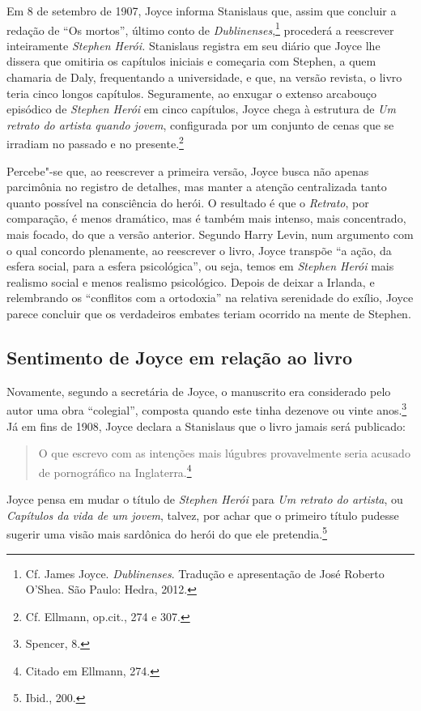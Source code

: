 Em 8 de setembro de 1907, Joyce informa Stanislaus que, assim que
concluir a redação de “Os mortos”, último conto de \textit{Dublinenses},\footnote{ Cf. James Joyce. 
\textit{Dublinenses}. Tradução e apresentação de José Roberto O'Shea. São Paulo: Hedra, 2012.} 
procederá a reescrever inteiramente
\textit{Stephen Herói.}  Stanislaus registra em seu diário que Joyce
lhe dissera que omitiria os capítulos iniciais e começaria com Stephen,
a quem chamaria de Daly, frequentando a universidade, e que, na versão
revista, o livro teria cinco longos capítulos.  Seguramente, ao enxugar
o extenso arcabouço episódico de \textit{Stephen Herói} em cinco
capítulos, Joyce chega à estrutura de \textit{Um retrato do artista
quando jovem}, configurada por um conjunto de cenas que se irradiam no
passado e no presente.\footnote{ Cf. Ellmann, op.cit., 274 e 307.}

Percebe"-se que, ao reescrever a primeira versão, Joyce busca não
apenas parcimônia no registro de detalhes, mas manter a atenção centralizada
tanto quanto possível na consciência do herói.  O resultado é que o
\textit{Retrato}, por comparação, é menos dramático, mas é também mais
intenso, mais concentrado, mais focado, do que a versão anterior. 
Segundo Harry Levin, num argumento com o qual concordo plenamente, ao
reescrever o livro, Joyce transpõe “a ação, da esfera social, para a
esfera psicológica”, ou seja, temos em \textit{Stephen Herói} mais	
realismo social e menos realismo psicológico.  Depois de deixar a
Irlanda, e relembrando os “conflitos com a ortodoxia” na relativa
serenidade do exílio, Joyce parece concluir que os verdadeiros embates
teriam ocorrido na mente de Stephen.


\subsection*{Sentimento de Joyce em relação ao livro}

Novamente, segundo a secretária de Joyce, o manuscrito era considerado
pelo autor uma obra “colegial”, composta quando este tinha dezenove ou
vinte anos.\footnote{ Spencer, 8.}  Já em fins de 1908, Joyce declara a Stanislaus		
que o livro jamais será publicado: 

\begin{quote}
O que escrevo com as intenções mais
lúgubres provavelmente seria acusado de pornográfico na Inglaterra.\footnote{			
Citado em Ellmann, 274.} 
\end{quote}

Joyce pensa em mudar o título de
\textit{Stephen Herói} para \textit{Um retrato do artista}, ou
\textit{Capítulos da vida de um jovem}, talvez, por achar que o
primeiro título pudesse sugerir uma visão mais sardônica do herói do
que ele pretendia.\footnote{ Ibid., 200.}					

